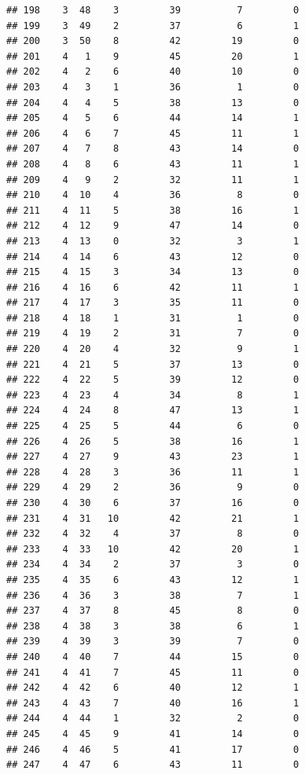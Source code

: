 \documentclass[]{book}
\begin{document}
\begin{verbatim}
## 198    3  48    3         39          7         0
## 199    3  49    2         37          6         1
## 200    3  50    8         42         19         0
## 201    4   1    9         45         20         1
## 202    4   2    6         40         10         0
## 203    4   3    1         36          1         0
## 204    4   4    5         38         13         0
## 205    4   5    6         44         14         1
## 206    4   6    7         45         11         1
## 207    4   7    8         43         14         0
## 208    4   8    6         43         11         1
## 209    4   9    2         32         11         1
## 210    4  10    4         36          8         0
## 211    4  11    5         38         16         1
## 212    4  12    9         47         14         0
## 213    4  13    0         32          3         1
## 214    4  14    6         43         12         0
## 215    4  15    3         34         13         0
## 216    4  16    6         42         11         1
## 217    4  17    3         35         11         0
## 218    4  18    1         31          1         0
## 219    4  19    2         31          7         0
## 220    4  20    4         32          9         1
## 221    4  21    5         37         13         0
## 222    4  22    5         39         12         0
## 223    4  23    4         34          8         1
## 224    4  24    8         47         13         1
## 225    4  25    5         44          6         0
## 226    4  26    5         38         16         1
## 227    4  27    9         43         23         1
## 228    4  28    3         36         11         1
## 229    4  29    2         36          9         0
## 230    4  30    6         37         16         0
## 231    4  31   10         42         21         1
## 232    4  32    4         37          8         0
## 233    4  33   10         42         20         1
## 234    4  34    2         37          3         0
## 235    4  35    6         43         12         1
## 236    4  36    3         38          7         1
## 237    4  37    8         45          8         0
## 238    4  38    3         38          6         1
## 239    4  39    3         39          7         0
## 240    4  40    7         44         15         0
## 241    4  41    7         45         11         0
## 242    4  42    6         40         12         1
## 243    4  43    7         40         16         1
## 244    4  44    1         32          2         0
## 245    4  45    9         41         14         0
## 246    4  46    5         41         17         0
## 247    4  47    6         43         11         0

\end{verbatim}
\end{document}
